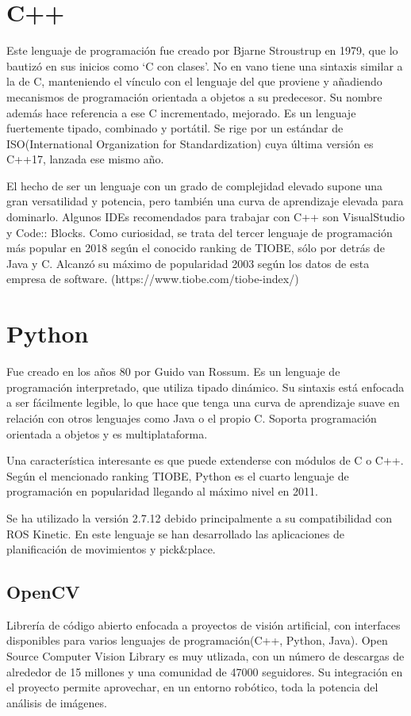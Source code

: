 \documentclass[12pt,spanish,chapterprefix, numbers=noenddot]{book}
\numberwithin{equation}{section}
\numberwithin{figure}{section}
\begin{document}
\section{C++}
Este lenguaje de programación fue creado por Bjarne Stroustrup en 1979, que lo bautizó en sus inicios como ‘C con clases’. No en vano tiene una sintaxis similar a la de C, manteniendo el vínculo con el lenguaje del que proviene y añadiendo mecanismos de programación orientada a objetos a su predecesor. Su nombre además hace referencia a ese C incrementado, mejorado. 
Es un lenguaje fuertemente tipado, combinado y portátil. Se rige por un estándar de ISO(International Organization for Standardization) cuya última versión es C++17, lanzada ese mismo año. 

El hecho de ser un lenguaje con un grado de complejidad elevado supone una gran versatilidad y potencia, pero también una curva de aprendizaje elevada para dominarlo.
Algunos IDEs recomendados para trabajar con C++ son VisualStudio y Code:: Blocks. 
Como curiosidad, se trata del tercer lenguaje de programación más popular en 2018 según el conocido ranking de TIOBE, sólo por detrás de Java y C. Alcanzó su máximo de popularidad 2003 según los datos de esta empresa de software. (https://www.tiobe.com/tiobe-index/)

\section{Python}
Fue creado en los años 80 por Guido van Rossum. Es un lenguaje de programación interpretado, que utiliza tipado dinámico. Su sintaxis está enfocada a ser fácilmente legible, lo que hace que tenga una curva de aprendizaje suave en relación con otros lenguajes como Java o el propio C. Soporta programación orientada a objetos y es multiplataforma.

Una característica interesante es que puede extenderse con módulos de C o C++.
Según el mencionado ranking TIOBE, Python es el cuarto lenguaje de programación en popularidad llegando al máximo nivel en 2011. 

Se ha utilizado la versión 2.7.12 debido principalmente a su compatibilidad con ROS Kinetic. En este lenguaje se han desarrollado las aplicaciones de planificación de movimientos y pick&place. 

\subsection{OpenCV}
Librería de código abierto enfocada a proyectos de visión artificial, con interfaces disponibles para varios lenguajes de programación(C++, Python, Java). 
Open Source Computer Vision Library es muy utlizada, con un número de descargas de alrededor de 15 millones y una comunidad de 47000 seguidores.  
Su integración en el proyecto permite aprovechar, en un entorno robótico, toda la potencia del análisis de imágenes. 
\end{document}
